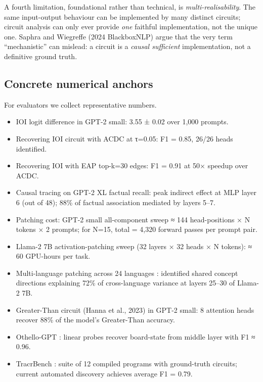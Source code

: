 \documentclass{article}
\begin{document}
A fourth limitation, foundational rather than technical, is \emph{multi-realisability}. The same input-output behaviour can be implemented by many distinct circuits; circuit analysis can only ever provide \emph{one} faithful implementation, not the unique one. Saphra and Wiegreffe (2024 BlackboxNLP) argue that the very term ``mechanistic'' can mislead: a circuit is a \emph{causal sufficient} implementation, not a definitive ground truth.

\subsection{Concrete numerical anchors}\label{concrete-numerical-anchors}

For evaluators we collect representative numbers.

\begin{itemize}

\item
  IOI logit difference in GPT-2 small: 3.55 ± 0.02 over 1,000 prompts.
\item
  Recovering IOI circuit with ACDC at τ=0.05: F1 = 0.85, 26/26 heads identified.
\item
  Recovering IOI with EAP top-k=30 edges: F1 = 0.91 at 50× speedup over ACDC.
\item
  Causal tracing on GPT-2 XL factual recall: peak indirect effect at MLP layer 6 (out of 48); 88\% of factual association mediated by layers 5--7.
\item
  Patching cost: GPT-2 small all-component sweep ≈ 144 head-positions × N tokens × 2 prompts; for N=15, total = 4,320 forward passes per prompt pair.
\item
  Llama-2 7B activation-patching sweep (32 layers × 32 heads × N tokens): ≈ 60 GPU-hours per task.
\item
  Multi-language patching across 24 languages \citep{dumas2024separatingtonguefr}: identified shared concept directions explaining 72\% of cross-language variance at layers 25--30 of Llama-2 7B.
\item
  Greater-Than circuit (Hanna et al., 2023) in GPT-2 small: 8 attention heads recover 88\% of the model's Greater-Than accuracy.
\item
  Othello-GPT \citep{li2024pmetprecisemodeled}: linear probes recover board-state from middle layer with F1 ≈ 0.96.
\item
  TracrBench \citep{thurnherr2024tracrbenchgenerati}: suite of 12 compiled programs with ground-truth circuits; current automated discovery achieves average F1 = 0.79.
\end{itemize}
\end{document}
